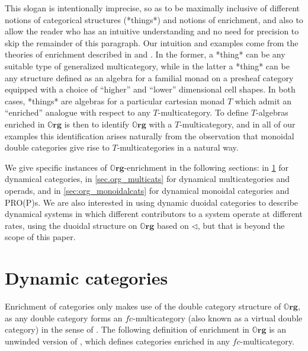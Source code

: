 \documentclass[11pt, one side, article]{memoir}
\theoremstyle{definition}
\theoremstyle{plain}
\newcommand{\Cat}[1]{\mathbf{#1}}%
\newcommand{\0}{\textsf{0}}
\newcommand{\1}{\tn{\textsf{1}}}
\newcommand{\tri}{\mathbin{\triangleleft}}
\newcommand{\org}{{\mathbb{O}\Cat{rg}}}
\begin{document}
This slogan is intentionally imprecise, so as to be maximally inclusive of different notions of categorical structures  (*things*) and notions of enrichment, and also to allow the reader who has an intuitive understanding and no need for precision to skip the remainder of this paragraph. Our intuition and examples come from the theories of enrichment described in \cite{leinster1999generalized} and \cite{shapiro2022enrichment}. In the former, a *thing* can be any suitable type of generalized multicategory, while in the latter a *thing* can be any structure defined as an algebra for a familial monad on a presheaf category equipped with a choice of ``higher'' and ``lower'' dimensional cell shapes. In both cases, *things* are algebras for a particular cartesian monad $T$ which admit an ``enriched'' analogue with respect to any $T$-multicategory. To define $T$-algebras enriched in $\org$ is then to identify $\org$ with a $T$-multicategory, and in all of our examples this identification arises naturally from the observation that monoidal double categories give rise to $T$-multicategories in a natural way.

We give specific instances of $\org$-enrichment in the following sections: in \cref{sec.org_cats} for dynamical categories, in \cref{sec.org_multicats} for dynamical multicategories and operads, and in \cref{sec:org_monoidalcats} for dynamical monoidal categories and PRO(P)s. We are also interested in using dynamic duoidal categories to describe dynamical systems in which different contributors to a system operate at different rates, using the duoidal structure on $\org$ based on $\tri$, but that is beyond the scope of this paper.


\section{Dynamic categories}\label{sec.org_cats}


Enrichment of categories only makes use of the double category structure of $\org$, as any double category forms an $f\!c$-multicategory (also known as a virtual double category) in the sense of \cite{leinster1999generalized}. %
The following definition of enrichment in $\org$ is an unwinded version of \cite{leinster1999generalized}, %
which defines categories enriched in any $f\!c$-multicategory.
\end{document}
